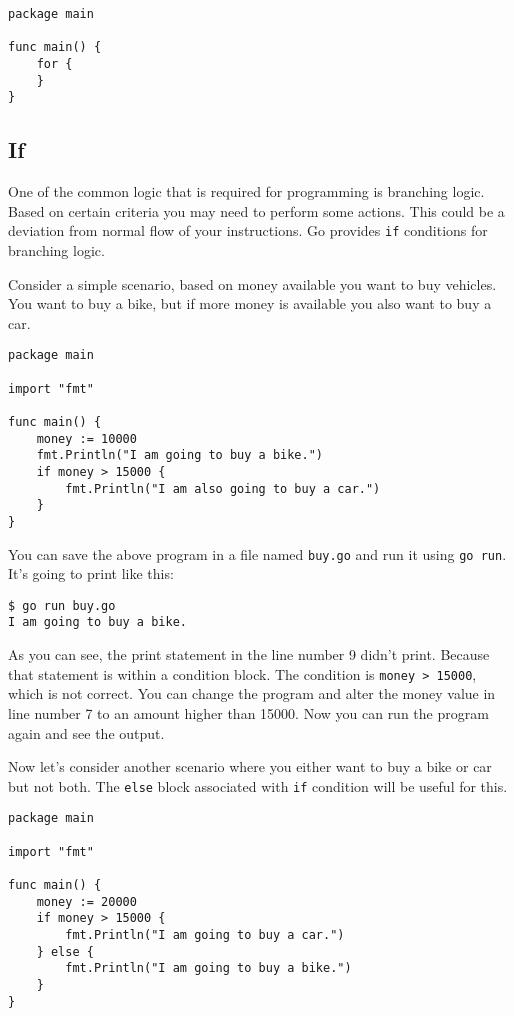 \begin{lstlisting}
package main

func main() {
    for {
    }
}
\end{lstlisting}

\subsection{If}

One of the common logic that is required for programming is branching
logic.  Based on certain criteria you may need to perform some
actions.  This could be a deviation from normal flow of your
instructions.  Go provides \texttt{if} conditions for
branching logic.

Consider a simple scenario, based on money available you want to buy
vehicles.  You want to buy a bike, but if more money is available you
also want to buy a car.

\begin{lstlisting}
package main

import "fmt"

func main() {
    money := 10000
    fmt.Println("I am going to buy a bike.")
    if money > 15000 {
        fmt.Println("I am also going to buy a car.")
    }
}
\end{lstlisting}

You can save the above program in a file named \texttt{buy.go} and run
it using \texttt{go run}.  It's going to print like this:

\begin{lstlisting}[numbers=none]
$ go run buy.go
I am going to buy a bike.
\end{lstlisting}

As you can see, the print statement in the line number 9 didn't print.
Because that statement is within a condition block.  The condition is
\texttt{money > 15000}, which is not correct.  You can change the program and
alter the money value in line number 7 to an amount higher than 15000.
Now you can run the program again and see the output.

Now let's consider another scenario where you either want to buy a
bike or car but not both.  The \texttt{else} block associated with
\texttt{if} condition will be useful for this.

\begin{lstlisting}
package main

import "fmt"

func main() {
    money := 20000
    if money > 15000 {
        fmt.Println("I am going to buy a car.")
    } else {
        fmt.Println("I am going to buy a bike.")
    }
}
\end{lstlisting}

